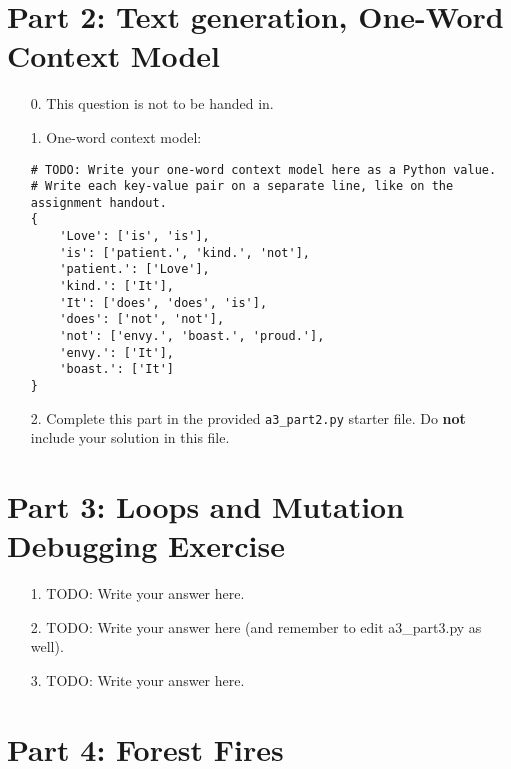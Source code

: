 \documentclass[fontsize=11pt]{article}
\begin{document}
\newpage

\section*{Part 2: Text generation, One-Word Context Model}

\begin{enumerate}

\item[0.]
This question is not to be handed in.

\item[1.]
One-word context model:

\begin{verbatim}
# TODO: Write your one-word context model here as a Python value.
# Write each key-value pair on a separate line, like on the assignment handout.
{
    'Love': ['is', 'is'],
    'is': ['patient.', 'kind.', 'not'],
    'patient.': ['Love'],
    'kind.': ['It'],
    'It': ['does', 'does', 'is'],
    'does': ['not', 'not'],
    'not': ['envy.', 'boast.', 'proud.'],
    'envy.': ['It'],
    'boast.': ['It']
}
\end{verbatim}

\item[2.]
Complete this part in the provided \texttt{a3\_part2.py} starter file.
Do \textbf{not} include your solution in this file.

\end{enumerate}

\newpage

\section*{Part 3: Loops and Mutation Debugging Exercise}

\begin{enumerate}
\item[1.]
TODO: Write your answer here.

\item[2.]
TODO: Write your answer here (and remember to edit a3\_part3.py as well).

\item[3.]
TODO: Write your answer here.
\end{enumerate}

\section*{Part 4: Forest Fires}
\end{document}
